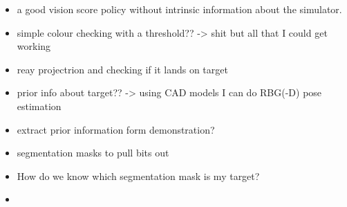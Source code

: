 \begin{itemize}
  \item a good vision score policy without intrinsic information about the simulator.
    \item simple colour checking with a threshold?? -> shit but all that I could get working 
    \item  reay projectrion and checking if it lands on target
      \item  prior info about target?? -> using CAD models I can do RBG(-D) pose estimation
      \item extract prior information form demonstration?
  \item segmentation masks to pull bits out
    \item  How do we know which segmentation mask is my target?
  \item 
\end{itemize}


